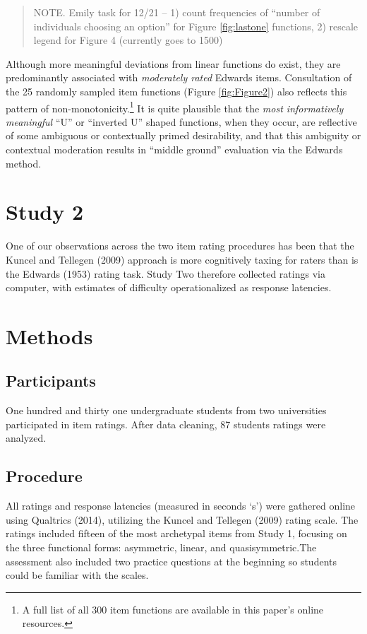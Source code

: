 \documentclass[
  ,jou]{apa6}
\begin{document}
\begin{quote}
NOTE. Emily task for 12/21 -- 1) count frequencies of ``number of individuals choosing an option'' for Figure \ref{fig:lastone} functions, 2) rescale legend for Figure 4 (currently goes to 1500)
\end{quote}

Although more meaningful deviations from linear functions do exist, they are predominantly associated with \emph{moderately rated} Edwards items. Consultation of the 25 randomly sampled item functions (Figure \ref{fig:Figure2}) also reflects this pattern of non-monotonicity.\footnote{A full list of all 300 item functions are available in this paper's online resources.} It is quite plausible that the \emph{most informatively meaningful} ``U'' or ``inverted U'' shaped functions, when they occur, are reflective of some ambiguous or contextually primed desirability, and that this ambiguity or contextual moderation results in ``middle ground'' evaluation via the Edwards method.

\section{Study 2}\label{study-2}

One of our observations across the two item rating procedures has been that the Kuncel and Tellegen (2009) approach is more cognitively taxing for raters than is the Edwards (1953) rating task. Study Two therefore collected ratings via computer, with estimates of difficulty operationalized as response latencies.

\section{Methods}\label{methods-1}

\subsection{Participants}\label{participants-1}

One hundred and thirty one undergraduate students from two universities participated in item ratings. After data cleaning, 87 students ratings were analyzed.

\subsection{Procedure}\label{procedure-1}

All ratings and response latencies (measured in seconds `s') were gathered online using Qualtrics (2014), utilizing the Kuncel and Tellegen (2009) rating scale. The ratings included fifteen of the most archetypal items from Study 1, focusing on the three functional forms: asymmetric, linear, and quasisymmetric.The assessment also included two practice questions at the beginning so students could be familiar with the scales.
\end{document}
